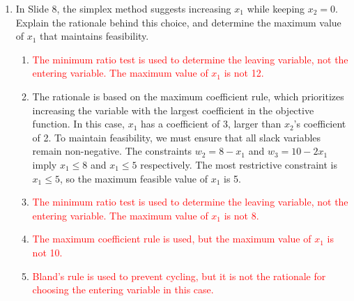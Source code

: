 \documentclass{article}%
\newcommand{\incorrect}[1]{\textcolor{red}{#1}}
\begin{document}
\begin{enumerate}
\begin{enumerate}
\begin{enumerate}%
\item The initial basic feasible solution is obtained by setting the non-basic variables $ x_1 $ and $ x_2 $ to zero. Substituting this into the constraints gives $ w_1 = 12, w_2 = 8, w_3 = 10 $. The corresponding value of the objective function is $ \zeta = 3(0) + 2(0) = 0 $.%
\item \incorrect{This solution is the optimal solution, not the initial basic feasible solution.}%
\item \incorrect{This solution corresponds to vertex A in the feasible region.}%
\item \incorrect{This solution corresponds to the optimal vertex B in the feasible region.}%
\item \incorrect{This is a feasible solution, but not the initial basic feasible solution.}%
\end{enumerate}%
\vspace{0.5em}%
\item In Slide 8, the simplex method suggests increasing $ x_1 $ while keeping $ x_2 = 0 $.  Explain the rationale behind this choice, and determine the maximum value of $ x_1 $ that maintains feasibility.%
\begin{enumerate}%
\item \incorrect{The minimum ratio test is used to determine the leaving variable, not the entering variable.  The maximum value of $ x_1 $ is not 12.}%
\item The rationale is based on the maximum coefficient rule, which prioritizes increasing the variable with the largest coefficient in the objective function. In this case, $ x_1 $ has a coefficient of 3, larger than $ x_2 $'s coefficient of 2.  To maintain feasibility, we must ensure that all slack variables remain non-negative.  The constraints $ w_2 = 8 - x_1 $ and $ w_3 = 10 - 2x_1 $ imply $ x_1 \le 8 $ and $ x_1 \le 5 $ respectively. The most restrictive constraint is $ x_1 \le 5 $, so the maximum feasible value of $ x_1 $ is 5.%
\item \incorrect{The minimum ratio test is used to determine the leaving variable, not the entering variable. The maximum value of $ x_1 $ is not 8.}%
\item \incorrect{The maximum coefficient rule is used, but the maximum value of $ x_1 $ is not 10.}%
\item \incorrect{Bland's rule is used to prevent cycling, but it is not the rationale for choosing the entering variable in this case.}%

\end{enumerate}
\end{enumerate}
\end{enumerate}
\end{document}
